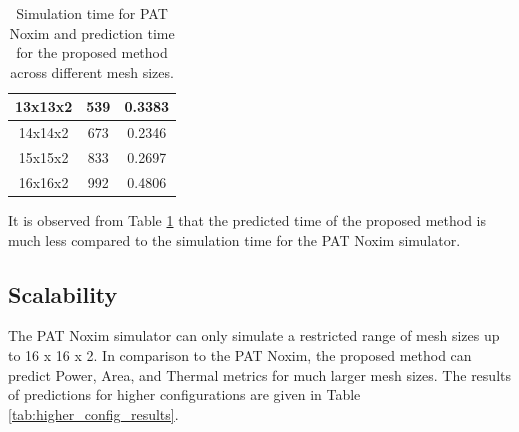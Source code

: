 \documentclass[conference]{IEEEtran}
\begin{document}
\begin{table}[h!]
\begin{tabular}{|c|c|c|}
		13x13x2            & 539                                     & 0.3383                                     \\ \hline
		14x14x2            & 673                                     & 0.2346                                     \\ \hline
		15x15x2            & 833                                     & 0.2697                                     \\ \hline
		16x16x2            & 992                                     & 0.4806                                     \\ \hline
	\end{tabular}
	\caption{Simulation time for PAT Noxim and prediction time for the proposed method across different mesh sizes.}
	\label{table:mesh_simulation_time}
\end{table}


It is observed from Table \ref{table:mesh_simulation_time} that the predicted time of the proposed method is much less compared to the simulation time for the PAT Noxim simulator.

\subsection{Scalability}
The PAT Noxim simulator can only simulate a restricted range of mesh sizes up to 16 x 16 x 2. In comparison to the PAT Noxim, the proposed method can predict Power, Area, and Thermal metrics for much larger mesh sizes. The results of predictions for higher configurations are given in Table \ref{tab:higher_config_results}.
\end{document}
